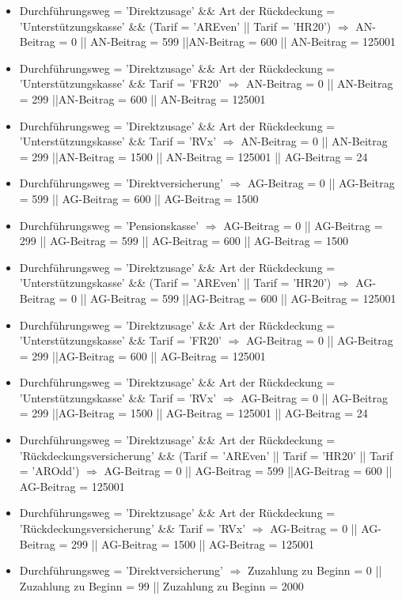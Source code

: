 \begin{itemize}
\item Durchführungsweg = 'Direktzusage' \&\& Art der Rückdeckung = 'Unterstützungskasse' \&\& (Tarif = 'AREven' || Tarif = 'HR20') $\Rightarrow$ AN-Beitrag = 0 || AN-Beitrag = 599 ||AN-Beitrag = 600 || AN-Beitrag = 125001
\item Durchführungsweg = 'Direktzusage' \&\& Art der Rückdeckung = 'Unterstützungskasse' \&\& Tarif = 'FR20' $\Rightarrow$ AN-Beitrag = 0 || AN-Beitrag = 299 ||AN-Beitrag = 600 || AN-Beitrag = 125001
\item Durchführungsweg = 'Direktzusage' \&\& Art der Rückdeckung = 'Unterstützungskasse' \&\& Tarif = 'RVx' $\Rightarrow$ AN-Beitrag = 0 || AN-Beitrag = 299 ||AN-Beitrag = 1500 || AN-Beitrag = 125001 || AG-Beitrag = 24
\item Durchführungsweg = 'Direktversicherung' $\Rightarrow$ AG-Beitrag = 0 || AG-Beitrag = 599 || AG-Beitrag = 600 || AG-Beitrag = 1500
\item Durchführungsweg = 'Pensionskasse' $\Rightarrow$ AG-Beitrag = 0 || AG-Beitrag = 299 || AG-Beitrag = 599 || AG-Beitrag = 600 || AG-Beitrag = 1500
\item Durchführungsweg = 'Direktzusage' \&\& Art der Rückdeckung = 'Unterstützungskasse' \&\& (Tarif = 'AREven' || Tarif = 'HR20') $\Rightarrow$ AG-Beitrag = 0 || AG-Beitrag = 599 ||AG-Beitrag = 600 || AG-Beitrag = 125001
\item Durchführungsweg = 'Direktzusage' \&\& Art der Rückdeckung = 'Unterstützungskasse' \&\& Tarif = 'FR20' $\Rightarrow$ AG-Beitrag = 0 || AG-Beitrag = 299 ||AG-Beitrag = 600 || AG-Beitrag = 125001
\item Durchführungsweg = 'Direktzusage' \&\& Art der Rückdeckung = 'Unterstützungskasse' \&\& Tarif = 'RVx' $\Rightarrow$ AG-Beitrag = 0 || AG-Beitrag = 299 ||AG-Beitrag = 1500 || AG-Beitrag = 125001 || AG-Beitrag = 24
\item Durchführungsweg = 'Direktzusage' \&\& Art der Rückdeckung = 'Rückdeckungsversicherung' \&\& (Tarif = 'AREven' || Tarif = 'HR20' || Tarif = 'AROdd') $\Rightarrow$ AG-Beitrag = 0 || AG-Beitrag = 599 ||AG-Beitrag = 600 || AG-Beitrag = 125001
\item Durchführungsweg = 'Direktzusage' \&\& Art der Rückdeckung = 'Rückdeckungsversicherung' \&\& Tarif = 'RVx' $\Rightarrow$ AG-Beitrag = 0 || AG-Beitrag = 299 || AG-Beitrag = 1500 || AG-Beitrag = 125001
\item Durchführungsweg = 'Direktversicherung' $\Rightarrow$ Zuzahlung zu Beginn = 0 || Zuzahlung zu Beginn = 99 || Zuzahlung zu Beginn = 2000

\end{itemize}
